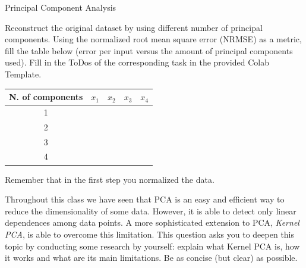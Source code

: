 \documentclass[
	english,
        solution=true
	]{tudaexercise}
\begin{document}
\begin{task}[points=28]{Principal Component Analysis}
\begin{subtask}[points=6, title=Low Dimensional Space]
\begin{solution}

\end{solution}

\end{subtask}



\begin{subtask}[points=6, title=Projection to the Original Space]
Reconstruct the original dataset by using different number of principal components. Using the normalized root mean square error (NRMSE) as a metric, fill the table below (error per input versus the amount of principal components used). Fill in the ToDos of the corresponding task in the provided Colab Template.

\begin{tabular}{c|r|r|r|r}
N. of components & $x_1$ & $x_2$ & $x_3$ & $x_4$ \\
\hline
1 & & & & \\
2 & & & & \\
3 & & & & \\
4 & & & &
\end{tabular}

Remember that in the first step you normalized the data.

\begin{solution}

\end{solution}
\end{subtask}

\newpage

\begin{subtask}[points=5, title=Kernel PCA]
Throughout this class we have seen that PCA is an easy and efficient way to reduce the dimensionality of some data. However, it is able to detect only linear dependences among data points. A more sophisticated extension to PCA, \emph{Kernel PCA}, is able to overcome this limitation. 
This question asks you to deepen this topic by conducting some research by yourself: explain what Kernel PCA is, how it works and what are its main limitations. Be as concise (but clear) as possible.

\begin{solution}

\end{solution}
\end{subtask}
\end{task}

\newpage
\end{document}
